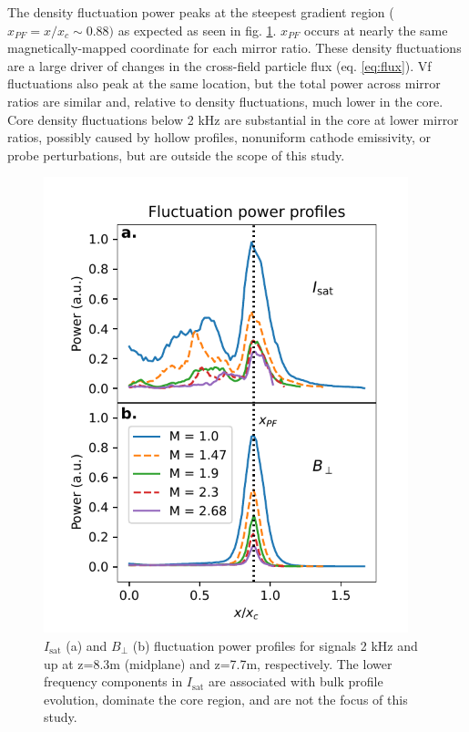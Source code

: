 The density fluctuation power peaks at the steepest gradient region ($x_{PF} = x/x_c \sim 0.88)$ as expected as seen in fig. \ref{fig:isat-fluct-prof}. $x_{PF}$ occurs at nearly the same magnetically-mapped coordinate for each mirror ratio. These density fluctuations are a large driver of changes in the cross-field particle flux (eq. \ref{eq:flux}). Vf fluctuations also peak at the same location, but the total power across mirror ratios are similar and, relative to density fluctuations, much lower in the core. Core density fluctuations below 2 kHz are substantial in the core at lower mirror ratios, possibly caused by hollow profiles, nonuniform cathode emissivity, or probe perturbations, but are outside the scope of this study. 
\begin{figure}
    \centering
    \includegraphics[width=300pt]{figures/fig7.pdf}
    \caption{$I_\text{sat}$ (a) and $B_\perp$ (b) fluctuation power profiles for signals 2 kHz and up at z=8.3m (midplane) and z=7.7m, respectively. The lower frequency components in $I_\text{sat}$ are associated with bulk profile evolution, dominate the core region, and are not the focus of this study.}
    \label{fig:isat-fluct-prof}
\end{figure}


